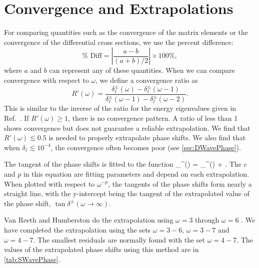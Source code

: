\documentclass[Dissertation.tex]{subfiles}
\begin{document}
\section{Convergence and Extrapolations}
\label{sec:Extrapolations}

For comparing quantities such as the convergence of the matrix elements or 
the convergence of the differential cross sections, we use the percent
difference:
\begin{equation}
\label{eq:PercentDiff}
\% \text{ Diff} = \left| \frac{a - b}{(a + b) / 2} \right| \times 100\%,
\end{equation}
where $a$ and $b$ can represent any of these quantities.
When we can compare convergence with respect to $\omega$, we define a
convergence ratio as
\begin{equation}
\label{eq:ConvRatio}
R'(\omega) = \frac{\delta_\ell^\pm(\omega)-\delta_\ell^\pm(\omega-1)}
  {\delta_\ell^\pm(\omega-1)-\delta_\ell^\pm(\omega-2)}.
\end{equation}
This is similar to the inverse of the ratio for the energy eigenvalues given in
Ref.~\cite{Yan1999}. If $R'(\omega) \geq 1$, there is no convergence
pattern. A ratio of less than 1 shows convergence but does not guarantee a
reliable extrapolation. We find that $R'(\omega) \lesssim 0.5$ is
needed to properly extrapolate phase shifts. We also find that when
$\delta_\ell \lesssim 10^{-4}$, the convergence often becomes poor
(see \cref{sec:DWavePhase}).

The tangent of the phase shifts is fitted to the function
\beq
\label{eq:PhaseExtrap}
\tan \delta_\ell^\pm(\omega) = \tan \delta_\ell^\pm(\omega \to \infty) + .
\eeq
The $c$ and $p$ in this equation are fitting parameters and depend on each extrapolation. When plotted with respect to $\omega^{-p}$, the tangents of the phase shifts form nearly a straight line, with the y-intercept being the tangent of the extrapolated value of the phase shift, $\tan \delta^\pm(\omega \to \infty)$.

Van Reeth and Humberston \cite{VanReeth2003} do the extrapolation using $\omega = 3$ 
through $\omega = 6$ . %
We have completed the extrapolation using the sets $\omega = 3-6$,
$\omega = 3-7$ and $\omega = 4-7$. The smallest residuals are normally found
with the set $\omega = 4-7$. The values of the extrapolated phase shifts using
this method are in \cref{tab:SWavePhase}.
\end{document}
